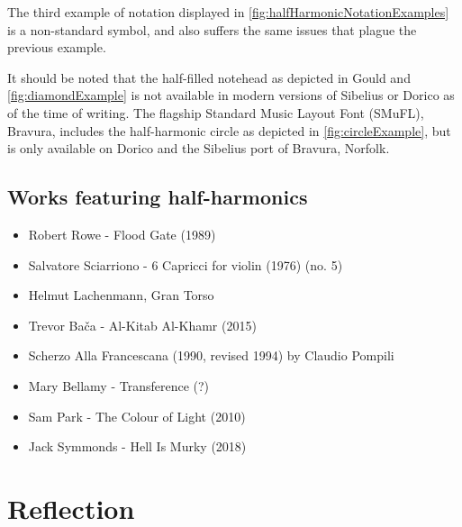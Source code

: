 The third example of notation displayed in \autoref{fig:halfHarmonicNotationExamples} is a non-standard symbol, and also suffers the same issues that plague the previous example.

It should be noted that the half-filled notehead as depicted in Gould and \autoref{fig:diamondExample} is not available in modern versions of Sibelius or Dorico as of the time of writing.\autocite[424]{gouldBars2011}
The flagship Standard Music Layout Font (SMuFL), Bravura, includes the half-harmonic circle as depicted in \autoref{fig:circleExample}, but is only available on Dorico and the Sibelius port of Bravura, Norfolk.\autocite[]{w3ccommitteeStandardMusicFont2019}

\subsection{Works featuring half-harmonics} \label{sec:half-harmonicsLiterature}

\begin{itemize}
    \item Robert Rowe - Flood Gate (1989)
    \item Salvatore Sciarriono - 6 Capricci for violin (1976) (no. 5)
    \item Helmut Lachenmann, Gran Torso
    \item Trevor Bača - Al-Kitab Al-Khamr (2015)
    \item Scherzo Alla Francescana (1990, revised 1994) by Claudio Pompili 
    \item Mary Bellamy - Transference (?)
    \item Sam Park - The Colour of Light (2010)
    \item Jack Symmonds - Hell Is Murky (2018)
\end{itemize}

\section{Reflection}




\lipsum[4]